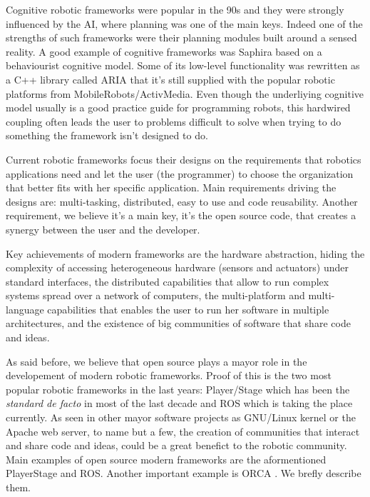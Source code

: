 \documentclass[twocolumn]{svjour3}          %
\begin{document}
Cognitive robotic frameworks were popular in the 90s and they were
strongly influenced by the AI, where planning was one of the main
keys. Indeed one of the strengths of such frameworks were their
planning modules built around a sensed reality. A good example of cognitive
frameworks was Saphira \cite{konolige98} based on a behaviourist
cognitive model. Some of its low-level functionality was rewritten as a
C++ library called ARIA \cite{aria} that it's still supplied with the
popular robotic platforms from MobileRobots/ActivMedia. Even though
the underliying cognitive model usually is a good practice guide for
programming robots, this hardwired coupling often leads the user to
problems difficult to solve when trying to do something the framework
isn't designed to do.

Current robotic frameworks focus their designs on the requirements
that robotics applications need and let the user (the programmer) to
choose the organization that better fits with her specific
application. Main requirements driving the designs are: multi-tasking, distributed, easy to
use and code reusability. Another requirement, we believe it's a main
key, it's the open source code, that creates a synergy between the user
and the developer. 

Key achievements of modern frameworks are the hardware abstraction, hiding the complexity of accessing heterogeneous hardware (sensors and
actuators) under standard interfaces, the distributed capabilities
that allow to run complex systems spread over a network of computers,
the multi-platform and multi-language capabilities that enables the
user to run her software in multiple architectures, and the existence
of big communities of software that share code and ideas.

As said before, we believe that open source plays a mayor role in the
developement of modern robotic frameworks. Proof of this is the two most popular robotic
frameworks in the last years: Player/Stage
\cite{Gerkey03,collet05,vaughan2007} which has been the \textit{standard de
facto} in most of the last decade and ROS \cite{quigley09} which is
taking the place currently. As seen in other mayor software projects
as GNU/Linux kernel or the Apache web server, to name but a few, the
creation of communities that interact and share code and ideas, could
be a great benefict to the robotic community. Main examples of open
source modern frameworks are the aformentioned PlayerStage and
ROS. Another important example is ORCA \cite{brooks05,brooks07}. We
brefly describe them.
\end{document}
